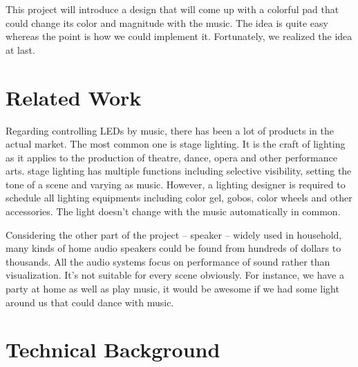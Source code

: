 \documentclass[12pt,a4paper,journal]{IEEEtran}
\begin{document}
This project will introduce a design that will come up with a colorful pad that could change its color and magnitude with the music. The idea is quite easy whereas the point is how we could implement it. Fortunately, we realized the idea at last.

\section{Related Work}

Regarding controlling LEDs by music, there has been a lot of products in the actual market. The most common one is stage lighting. It is the craft of lighting as it applies to the production of theatre, dance, opera and other performance arts. stage lighting has multiple functions including selective visibility, setting the tone of a scene and varying as music.  However, a lighting designer is required to schedule all lighting equipments including color gel, gobos, color wheels and other accessories. The light doesn't change with the music automatically in common. 

Considering the other part of the project -- speaker -- widely used in household, many kinds of home audio speakers could be found from hundreds of dollars to thousands. All the audio systems focus on performance of sound rather than visualization. It's not suitable for every scene obviously. For instance, we have a party at home as well as play music, it would be awesome if we had some light around us that could dance with music.

\section{Technical Background}
\end{document}
